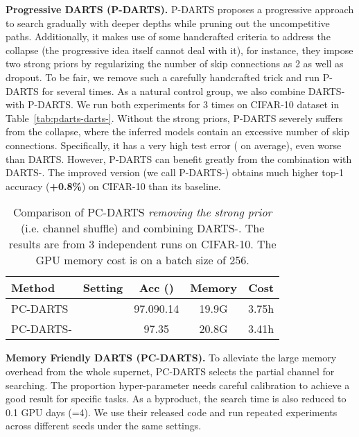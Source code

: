 \documentclass{article} \usepackage{iclr2021_conference,times}
\begin{document}
\textbf{Progressive DARTS (P-DARTS).} P-DARTS \citep{chen2019progressive} proposes a progressive approach to search gradually with deeper depths while pruning out the uncompetitive paths. Additionally, it makes use of some handcrafted criteria to address the collapse (the progressive idea itself cannot deal with it), for instance, they impose two strong priors by regularizing the number of skip connections  as 2 as well as dropout. To be fair, we remove such a carefully handcrafted trick and run P-DARTS for several times. As a natural control group, we also combine DARTS- with P-DARTS. We run both experiments for 3 times on CIFAR-10 dataset in Table~\ref{tab:pdarts-darts-}. Without the strong priors, P-DARTS severely suffers from the collapse, where the inferred models contain an excessive number of skip connections.  Specifically, it has a very high test error ( on average), even worse than DARTS.  However, P-DARTS can benefit greatly from the combination with DARTS-. The improved version (we call P-DARTS-) obtains much higher top-1 accuracy (\textbf{+0.8\%}) on CIFAR-10 than its baseline.

\begin{wraptable}{r}{6.3cm}
	\vspace{-20pt}
	\setlength{\tabcolsep}{1pt}
	\small
	\centering
	\caption{Comparison of PC-DARTS \textit{removing the strong prior }(i.e. channel shuffle) and combining DARTS-. The results are from 3 independent runs on CIFAR-10. The GPU memory cost is on a batch size of 256.} 
	\smallskip\begin{tabular}{lp{1cm}ccc}
		\toprule
		\textbf{Method}&  \textbf{Setting} &  \textbf{Acc} () & \textbf{Memory} & \textbf{Cost} \\
		\midrule
		PC-DARTS  &  &   97.090.14 & 19.9G & 3.75h \\
		PC-DARTS-    &   & 97.35 & 20.8G & 3.41h \\
		\bottomrule
	\end{tabular}
	\label{tab:pcdarts-darts-}
	\vspace{-15pt}
\end{wraptable}

\textbf{Memory Friendly DARTS (PC-DARTS).}
To alleviate the large memory overhead from the whole supernet, PC-DARTS \citep{xu2020pcdarts} selects the partial channel for searching.  The proportion hyper-parameter  needs careful calibration to achieve a good result for specific tasks.  As a  byproduct, the search time is also reduced to 0.1 GPU days (=4).  We use their released code and run repeated experiments across different seeds under the same  settings. 
\end{document}
